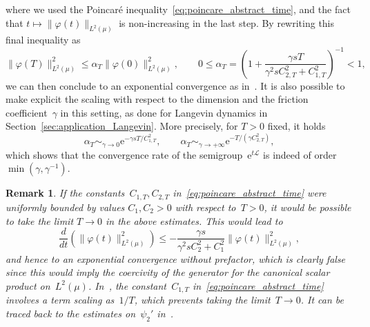 \documentclass{article}
\newtheorem{remark}{Remark}
\newcommand{\rme}{\mathrm{e}}
\newcommand{\cL}{\mathcal{L}}
\renewcommand{\leq}{\leqslant}
\begin{document}
where we used the Poincar\'e inequality~\eqref{eq:poincare_abstract_time}, and the fact that $t \mapsto \|\varphi(t)\|_{L^2(\mu)}$ is non-increasing in the last step. By rewriting this final inequality as
\[
\|\varphi(T)\|_{L^2(\mu)}^2 \leq \alpha_T \|\varphi(0)\|_{L^2(\mu)}^2, \qquad 0 \leq \alpha_T = \left(1+\frac{\gamma sT}{\gamma^2 sC_{2,T}^2 + C_{1,T}^2}\right)^{-1} < 1,
\]
we can then conclude to an exponential convergence as in~\cite{AM19,CLW19}. It is also possible to make explicit the scaling with respect to the dimension and the friction coefficient~$\gamma$ in this setting, as done for Langevin dynamics in Section~\ref{sec:application_Langevin}. More precisely, for $T>0$ fixed, it holds
\[
\alpha_T \mathop{\sim}_{\gamma\to 0} \rme^{-\gamma s T/C_{1,T}^2}, \qquad \alpha_T \mathop{\sim}_{\gamma\to +\infty} \rme^{-T/(\gamma C_{2,T}^2)},
\]
which shows that the convergence rate of the semigroup~$\rme^{t \cL}$ is indeed of order~$\min(\gamma,\gamma^{-1})$.

\begin{remark}
  \label{rmk:false}
  If the constants~$C_{1,T},C_{2,T}$ in~\eqref{eq:poincare_abstract_time} were uniformly bounded by values $C_1,C_2>0$ with respect to~$T > 0$, it would be possible to take the limit $T \to 0$ in the above estimates. This would lead to
\[
\frac{d}{dt} \left( \|\varphi(t)\|_{L^2(\mu)}^2 \right) \leq -\frac{\gamma s}{\gamma^2 sC_{2}^2 + C_{1}^2} \|\varphi(t)\|_{L^2(\mu)}^2,
\]
and hence to an exponential convergence without prefactor, which is clearly false since this would imply the coercivity of the generator for the canonical scalar product on~$L^2(\mu)$. In~\cite{CLW19}, the constant~$C_{1,T}$ in~\eqref{eq:poincare_abstract_time} involves a term scaling as~$1/T$, which prevents taking the limit~$T \to 0$. It can be traced back to the estimates on~$\psi_2'$ in~\cite[Lemma~2.6]{CLW19}.
\end{remark}

\end{document}
